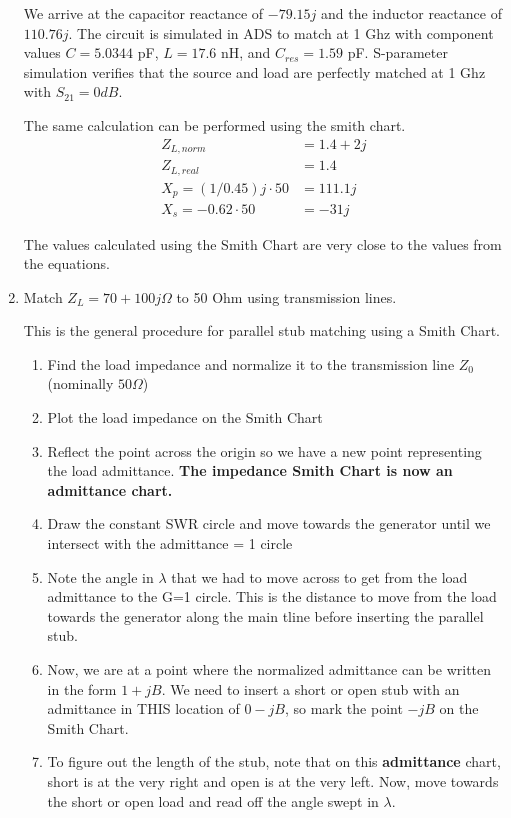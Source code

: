 \begin{enumerate}[label=(\alph*)]
    We arrive at the capacitor reactance of $-79.15j$ and the inductor reactance of $110.76j$.
    The circuit is simulated in ADS to match at 1 Ghz with component values $C = 5.0344$ pF, $L = 17.6$ nH, and $C_{res} = 1.59$ pF.
    S-parameter simulation verifies that the source and load are perfectly matched at 1 Ghz with $S_{21} = 0 dB$.

    The same calculation can be performed using the smith chart.
    \begin{align*}
        Z_{L,norm} &= 1.4 + 2j \\
        Z_{L,real} &= 1.4 \\
        X_p = (1/0.45)j \cdot 50 &= 111.1j \\
        X_s = -0.62 \cdot 50 &= -31j
    \end{align*}

    The values calculated using the Smith Chart are very close to the values from the equations.

    \item Match $Z_L = 70 + 100j \Omega$ to 50 Ohm using transmission lines.

    This is the general procedure for parallel stub matching using a Smith Chart.
    \begin{enumerate}
        \item Find the load impedance and normalize it to the transmission line $Z_0$ (nominally $50 \Omega$)
        \item Plot the load impedance on the Smith Chart
        \item Reflect the point across the origin so we have a new point representing the load admittance. \textbf{The impedance Smith Chart is now an admittance chart.}
        \item Draw the constant SWR circle and move towards the generator until we intersect with the admittance = 1 circle
        \item Note the angle in $\lambda$ that we had to move across to get from the load admittance to the G=1 circle.
            This is the distance to move from the load towards the generator along the main tline before inserting the parallel stub.
        \item Now, we are at a point where the normalized admittance can be written in the form $1 + jB$.
            We need to insert a short or open stub with an admittance in THIS location of $0 - jB$, so mark the point $-jB$ on the Smith Chart.
        \item To figure out the length of the stub, note that on this \textbf{admittance} chart, short is at the very right and open is at the very left.
            Now, move towards the short or open load and read off the angle swept in $\lambda$.
    \end{enumerate}


\end{enumerate}
